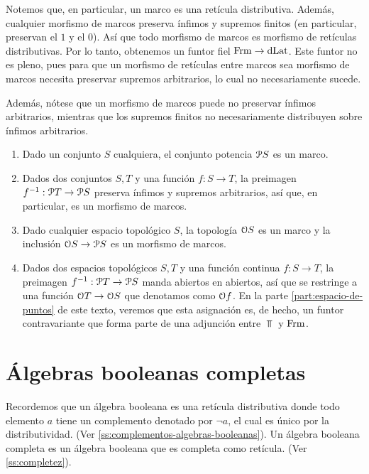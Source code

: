 Notemos que, en particular, un marco es una retícula distributiva.
Además, cualquier morfismo de marcos preserva ínfimos y supremos
finitos (en particular, preservan el $1$ y el $0$). Así que todo
morfismo de marcos es morfismo de retículas distributivas. Por lo
tanto, obtenemos un funtor fiel $\Frm\to\DLat$. Este funtor no es
pleno, pues para que un morfismo de retículas entre marcos sea
morfismo de marcos necesita preservar supremos arbitrarios, lo cual no
necesariamente sucede.

Además, nótese que un morfismo de marcos puede no preservar ínfimos
arbitrarios, mientras que los supremos finitos no necesariamente
distribuyen sobre ínfimos arbitrarios.

\begin{example}
  \begin{enumerate}
    \item Dado un conjunto $S$ cualquiera, el conjunto potencia
    $\cal PS$ es un marco.
    \item Dados dos conjuntos $S,T$ y una función $f:S\to T$,
    la preimagen $f^{-1}:\cal PT\to\cal PS$ preserva ínfimos
    y supremos arbitrarios, así que, en particular, es un
    morfismo de marcos.
    \item Dado cualquier espacio topológico $S$, la topología
    $\cal OS$ es un marco y la inclusión $\cal OS\to\cal PS$
    es un morfismo de marcos.
    \item Dados dos espacios topológicos $S,T$ y una función
    continua $f:S\to T$, la preimagen $f^{-1}:\cal PT\to\cal
    PS$ manda abiertos en abiertos, así que se restringe a
    una función $\cal OT\to\cal OS$ que denotamos como $\cal
    Of$.
    En la parte \ref{part:espacio-de-puntos} de este texto,
    veremos que esta asignación es, de hecho, un funtor
    contravariante que forma parte de una
    adjunción entre $\Top$ y $\Frm$.
  \end{enumerate}
\end{example}

\section{Álgebras booleanas completas}\label{ABC}
Recordemos que un álgebra booleana es una retícula distributiva
donde todo elemento $a$ tiene un complemento denotado por $\neg a$, 
el cual es único por la distributividad. (Ver \ref{ss:complementos-algebras-booleanas}).
Un álgebra booleana completa es un álgebra booleana que es
completa como retícula. (Ver \ref{ss:completez}).



